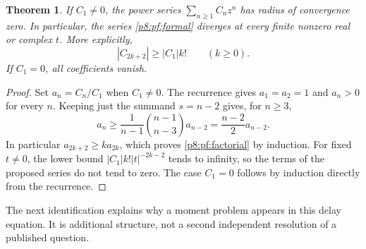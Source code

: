 \documentclass[11pt,a4paper]{article}
\newtheorem{theorem}{Theorem}[section]
\theoremstyle{definition}
\theoremstyle{remark}
\numberwithin{equation}{section}
\begin{document}
\begin{theorem}\label{p8:pf:divergence}
If $C_1\ne0$, the power series $\sum_{n\geq1}C_nz^n$ has radius of
convergence zero. In particular, the series \eqref{p8:pf:formal} diverges at
every finite nonzero real or complex $t$. More explicitly,
\begin{equation}\label{p8:pf:factorial}
 |C_{2k+2}|\geq |C_1|k!\qquad(k\geq0).
\end{equation}
If $C_1=0$, all coefficients vanish.
\end{theorem}
\begin{proof}
Set $a_n=C_n/C_1$ when $C_1\ne0$. The recurrence gives $a_1=a_2=1$ and
$a_n>0$ for every $n$. Keeping just the summand $s=n-2$ gives, for $n\geq3$,
\[
 a_n\geq \frac{1}{n-1}\binom{n-1}{n-3}a_{n-2}
       =\frac{n-2}{2}a_{n-2}.
\]
In particular $a_{2k+2}\geq k a_{2k}$, which proves \eqref{p8:pf:factorial}
by induction. For fixed $t\ne0$, the lower bound
$|C_1|k!|t|^{-2k-2}$ tends to infinity, so the terms of the proposed series
do not tend to zero. The case $C_1=0$ follows by induction directly from
the recurrence.
\end{proof}

The next identification explains why a moment problem appears in this
delay equation. It is additional structure, not a second independent
resolution of a published question.
\end{document}
